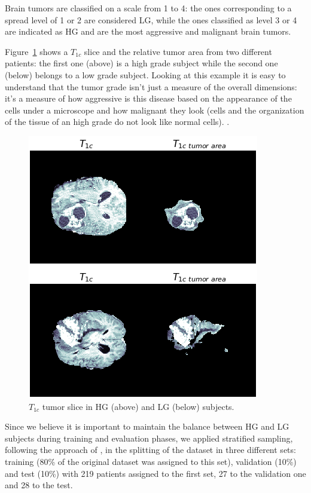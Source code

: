 Brain tumors are classified on a scale from 1 to 4: the ones corresponding to a spread level of 1 or 2 are considered LG, while the ones classified as level 3 or 4 are indicated as HG and are the most aggressive and malignant brain tumors\cite{grade_cancer}.

\vspace{2mm} %
Figure~\ref{fig:low_high} shows a $T_{1c}$ slice and the relative tumor area from two different patients: the first one (above) is a high grade subject while the second one (below) belongs to a low grade subject. Looking at this example it is easy to understand that the tumor grade isn't just a measure of the overall dimensions: it's a measure of how aggressive is this disease based on the appearance of the cells under a microscope and how malignant they look (cells and the organization of the tissue of an high grade do not look like normal cells). \cite{grade_cancer2}.

\begin{figure}[htbp!]
\centering
\includegraphics[height=0.42\textheight]{images/low_high_differences.pdf}
\caption[$T_{1c}$ slice in HG and LG subjects ]{$T_{1c}$ tumor slice in HG (above) and LG (below) subjects.}
\label{fig:low_high}
\end{figure}

\vspace{2mm} %
Since we believe it is important to maintain the balance between HG and LG subjects during training and evaluation phases, we applied stratified sampling, following the approach of \cite{Xue_2018}, in the splitting of the dataset in three different sets: training (80\% of the original dataset was assigned to this set), validation (10\%) and test (10\%) with 219 patients assigned to the first set, 27 to the validation one and 28 to the test.


